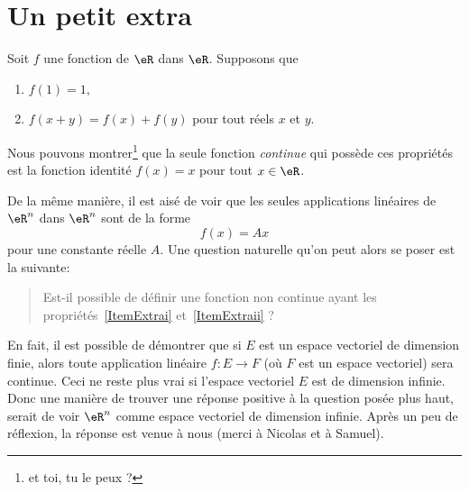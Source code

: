 					\section{Un petit extra}


Soit $f$ une fonction de $\eR$ dans $\eR$. Supposons que
\begin{enumerate}

\item		\label{ItemExtrai}
$f(1)=1$,

\item		\label{ItemExtraii}
$f(x+y)=f(x)+f(y)$ pour tout réels $x$ et $y$.

\end{enumerate}
Nous pouvons montrer\footnote{et toi, tu le peux ?} que la seule fonction {\it continue} qui possède ces propriétés est la fonction identité $f(x)=x$ pour tout $x\in\eR$.

De la même manière, il est aisé de voir que les seules applications linéaires de $\eR^n$ dans $\eR^n$ sont de la forme
\begin{equation}
	f(x)=Ax
\end{equation}
pour une constante réelle $A$. Une question naturelle qu'on peut alors se poser est la suivante:
\begin{quote}
	Est-il possible de définir une fonction non continue ayant les propriétés~\ref{ItemExtrai} et~\ref{ItemExtraii} ?
\end{quote}
En fait, il est possible de démontrer que si $E$ est un espace vectoriel de dimension finie, alors toute application linéaire $f:E\rightarrow  F$ (où $F$ est un espace vectoriel) sera continue. Ceci ne reste plus vrai si l'espace vectoriel $E$ est de dimension infinie. Donc une manière de trouver une réponse positive à la question posée plus haut, serait de voir $\eR^n$ comme espace vectoriel de dimension infinie. Après un peu de réflexion, la réponse est venue à nous (merci à Nicolas et à Samuel).

